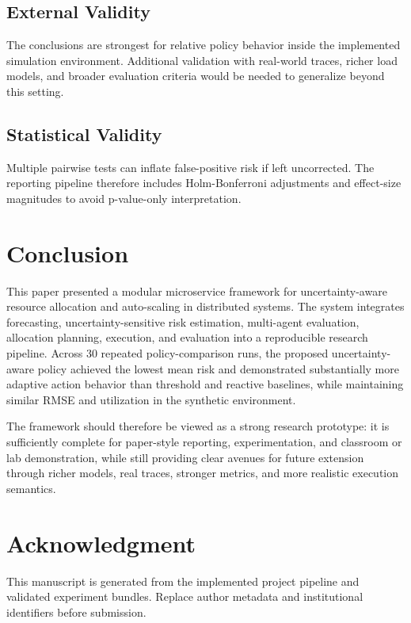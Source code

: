 \documentclass[conference]{IEEEtran}
\begin{document}
\subsection{External Validity}
The conclusions are strongest for relative policy behavior inside the implemented simulation environment. Additional validation with real-world traces, richer load models, and broader evaluation criteria would be needed to generalize beyond this setting.

\subsection{Statistical Validity}
Multiple pairwise tests can inflate false-positive risk if left uncorrected. The reporting pipeline therefore includes Holm-Bonferroni adjustments and effect-size magnitudes to avoid p-value-only interpretation.

\section{Conclusion}
This paper presented a modular microservice framework for uncertainty-aware resource allocation and auto-scaling in distributed systems. The system integrates forecasting, uncertainty-sensitive risk estimation, multi-agent evaluation, allocation planning, execution, and evaluation into a reproducible research pipeline. Across 30 repeated policy-comparison runs, the proposed uncertainty-aware policy achieved the lowest mean risk and demonstrated substantially more adaptive action behavior than threshold and reactive baselines, while maintaining similar RMSE and utilization in the synthetic environment.

The framework should therefore be viewed as a strong research prototype: it is sufficiently complete for paper-style reporting, experimentation, and classroom or lab demonstration, while still providing clear avenues for future extension through richer models, real traces, stronger metrics, and more realistic execution semantics.

\section*{Acknowledgment}
This manuscript is generated from the implemented project pipeline and validated experiment bundles. Replace author metadata and institutional identifiers before submission.




\balance
\end{document}
